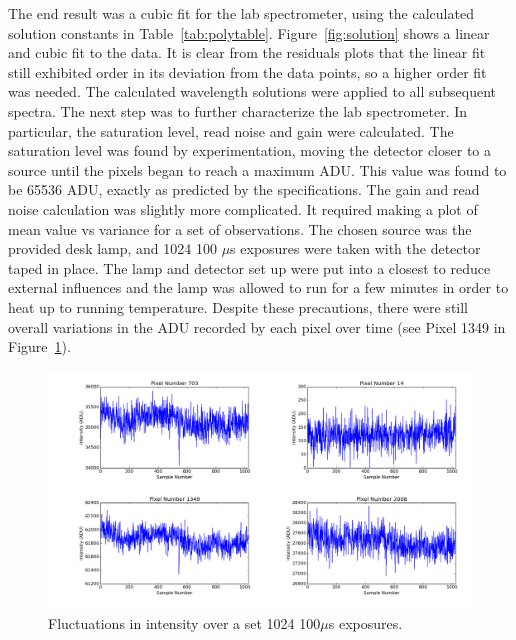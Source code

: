 \documentclass[a4paper,12pt]{article}
\begin{document}
The end result was a cubic fit for the lab spectrometer, using the calculated solution constants in Table~\ref{tab:polytable}. Figure~\ref{fig:solution} shows a linear and cubic fit to the data. It is clear from the residuals plots that the linear fit still exhibited order in its deviation from the data points, so a higher order fit was needed. The calculated wavelength solutions were applied to all subsequent spectra. The next step was to further characterize the lab spectrometer. In particular, the saturation level, read noise and gain were calculated. The saturation level was found by experimentation, moving the detector closer to a source until the pixels began to reach a maximum ADU. This value was found to be 65536 ADU, exactly as predicted by the specifications. The gain and read noise calculation was slightly more complicated. It required making a plot of mean value vs variance for a set of observations. The chosen source was the provided desk lamp, and 1024 100 $\mu$s exposures were taken with the detector taped in place. The lamp and detector set up were put into a closest to reduce external influences and the lamp was allowed to run for a few minutes in order to heat up to running temperature. Despite these precautions, there were still overall variations in the ADU recorded by each pixel over time (see Pixel 1349 in Figure~\ref{fig:pixels}).

\begin{figure}[!htbp]
\centering
\includegraphics[scale = 0.35]{pixels_vs_samples.png}
\caption{Fluctuations in intensity over a set 1024 100$\mu$s exposures.}
\label{fig:pixels}
\end{figure}
\end{document}
